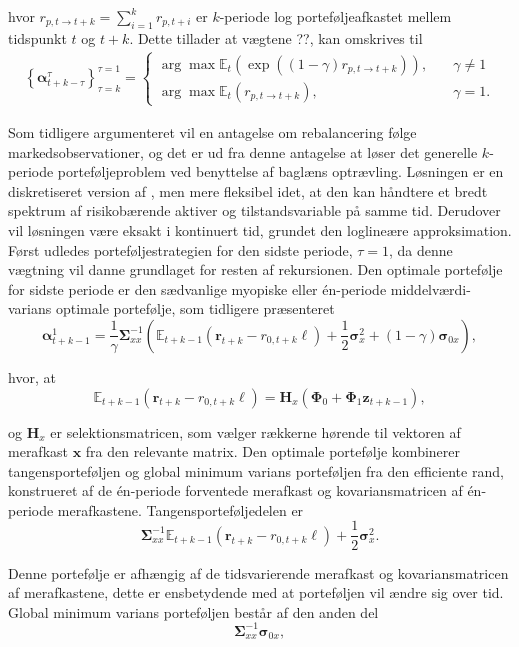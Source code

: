 \documentclass[
  a4paper,
  oneside]{memoir}
\begin{document}
hvor \(r_{p,t\to t+k}=\sum_{i=1}^k r_{p,t+i}\) er \(k\)-periode log porteføljeafkastet mellem tidspunkt \(t\) og \(t+k\). Dette tillader at vægtene ??, kan omskrives til
\begin{align}
\left\{\bm{\alpha}_{t+k-\tau}^\tau\right\}_{\tau=k}^{\tau=1}=\begin{cases}
\arg\max\mathbb{E}_t(\exp ((1-\gamma) r_{p,t\to t+k})),\quad &\gamma\neq 1\\
\arg\max\mathbb{E}_t(r_{p,t\to t+k}),\quad &\gamma=1.
\end{cases}
\end{align}

Som tidligere argumenteret vil en antagelse om rebalancering følge markedsobservationer, og det er ud fra denne antagelse at \citep{JurVic2011} løser det generelle \(k\)-periode porteføljeproblem ved benyttelse af baglæns optrævling. Løsningen er en diskretiseret version af \citep{Liu2007}, men mere fleksibel idet, at den kan håndtere et bredt spektrum af risikobærende aktiver og tilstandsvariable på samme tid. Derudover vil løsningen være eksakt i kontinuert tid, grundet den loglineære approksimation. Først udledes porteføljestrategien for den sidste periode, \(\tau=1\), da denne vægtning vil danne grundlaget for resten af rekursionen. Den optimale portefølje for sidste periode er den sædvanlige myopiske eller én-periode middelværdi-varians optimale portefølje, som tidligere præsenteret
\[\bm{\alpha}_{t+k-1}^1=\frac{1}{\gamma}\bm{\Sigma}_{xx}^{-1}\left(\mathbb{E}_{t+k-1}(\bm{r}_{t+k}-r_{0,t+k}\bm{\ell})+\frac{1}{2}\bm{\sigma}_x^2 + (1-\gamma) \bm{\sigma}_{0x}\right),\]

hvor, at
\[\mathbb{E}_{t+k-1}(\bm{r}_{t+k}-r_{0,t+k}\bm{\ell})=\bm{H}_x(\bm{\Phi}_0 + \bm{\Phi}_1 \bm{z}_{t+k-1}),\]

og \(\bm{H}_x\) er selektionsmatricen, som vælger rækkerne hørende til vektoren af merafkast \(\bm{x}\) fra den relevante matrix. Den optimale portefølje kombinerer tangensporteføljen og global minimum varians porteføljen fra den efficiente rand, konstrueret af de én-periode forventede merafkast og kovariansmatricen af én-periode merafkastene. Tangensporteføljedelen er
\[\bm{\Sigma}_{xx}^{-1}\mathbb{E}_{t+k-1}(\bm{r}_{t+k}-r_{0,t+k}\bm{\ell})+\frac{1}{2}\bm{\sigma}_x^2.\]

Denne portefølje er afhængig af de tidsvarierende merafkast og kovariansmatricen af merafkastene, dette er ensbetydende med at porteføljen vil ændre sig over tid. Global minimum varians porteføljen består af den anden del
\[\bm{\Sigma}_{xx}^{-1}\bm{\sigma}_{0x},\]
\end{document}
